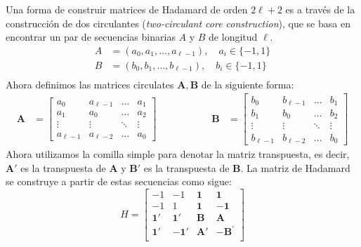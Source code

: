 \documentclass[12pt,a4paper]{tfg_domingo}
\newcommand{\seq}[1]{\mathbf{#1}}
\begin{document}
Una forma de construir matrices de Hadamard de orden $2\ell + 2$ es a
través de la construcción de dos circulantes (\emph{two-circulant core
  construction}), que se basa en encontrar un par de secuencias
binarias $A$ y $B$ de longitud $\ell$.
\begin{eqnarray*}
  A &= (a_{0}, a_{1}, \dots, a_{\ell-1}), \quad a_i \in \{-1, 1\} \\
  B &= (b_{0}, b_{1}, \dots, b_{\ell-1}), \quad b_i \in \{-1, 1\}\\
\end{eqnarray*}
Ahora definimos las matrices circulates $\seq{A}, \seq{B}$ de la
siguiente forma:
\begin{equation*}
  \begin{aligned}
    \seq{A} &=
    \begin{bmatrix}
      a_0 & a_{\ell-1} & \dots & a_1 \\
      a_1 & a_0 & \dots & a_2 \\
      \vdots & \vdots & \ddots & \vdots \\
      a_{\ell-1} & a_{\ell-2} & \dots & a_0
    \end{bmatrix}
  \end{aligned}
  \hspace{2cm} %
  \begin{aligned}
    \seq{B} &=
    \begin{bmatrix}
      b_0 & b_{\ell-1} & \dots & b_1 \\
      b_1 & b_0 & \dots & b_2 \\
      \vdots & \vdots & \ddots & \vdots \\
      b_{\ell-1} & b_{\ell-2} & \dots & b_0
    \end{bmatrix}
  \end{aligned}
\end{equation*}
Ahora utilizamos la comilla simple para denotar la matriz
transpuesta, es decir, $\seq{A}'$ es la transpuesta de $\seq{A}$ y
$\seq{B}'$ es la transpuesta de $\seq{B}$. La matriz de Hadamard se construye
a partir de estas secuencias como sigue:
  \[
  H = \begin{bmatrix}
    -1 & -1 & \mathbf{1} & \mathbf{1} \\
    -1 & 1 & \mathbf{1} & -\mathbf{1} \\    
    \mathbf{1}' & \mathbf{1}' & \seq{B} & \seq{A} \\
    \mathbf{1}' & -\mathbf{1}' & \seq{A}'  & -\seq{B}^{'} \\
    \end{bmatrix}
  \]
\end{document}

